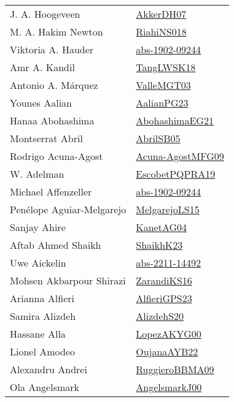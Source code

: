 {\begin{longtable}{p{4cm}p{20cm}}
J. A. Hoogeveen & \href{papers/AkkerDH07.pdf}{AkkerDH07}\cite{AkkerDH07} \\
M. A. Hakim Newton & \href{papers/RiahiNS018.pdf}{RiahiNS018}\cite{RiahiNS018} \\
Viktoria A. Hauder & \href{articles/abs-1902-09244.pdf}{abs-1902-09244}\cite{abs-1902-09244} \\
Amr A. Kandil & \href{}{TangLWSK18}\cite{TangLWSK18} \\
Antonio A. M{\'{a}}rquez & \href{papers/ValleMGT03.pdf}{ValleMGT03}\cite{ValleMGT03} \\
Younes Aalian & \href{papers/AalianPG23.pdf}{AalianPG23}\cite{AalianPG23} \\
Hanaa Abohashima & \href{articles/AbohashimaEG21.pdf}{AbohashimaEG21}\cite{AbohashimaEG21} \\
Montserrat Abril & \href{papers/AbrilSB05.pdf}{AbrilSB05}\cite{AbrilSB05} \\
Rodrigo Acuna{-}Agost & \href{papers/Acuna-AgostMFG09.pdf}{Acuna-AgostMFG09}\cite{Acuna-AgostMFG09} \\
W. Adelman & \href{articles/EscobetPQPRA19.pdf}{EscobetPQPRA19}\cite{EscobetPQPRA19} \\
Michael Affenzeller & \href{articles/abs-1902-09244.pdf}{abs-1902-09244}\cite{abs-1902-09244} \\
Pen{\'{e}}lope Aguiar{-}Melgarejo & \href{papers/MelgarejoLS15.pdf}{MelgarejoLS15}\cite{MelgarejoLS15} \\
Sanjay Ahire & \href{}{KanetAG04}\cite{KanetAG04} \\
Aftab Ahmed Shaikh & \href{}{ShaikhK23}\cite{ShaikhK23} \\
Uwe Aickelin & \href{articles/abs-2211-14492.pdf}{abs-2211-14492}\cite{abs-2211-14492} \\
Mohsen Akbarpour Shirazi & \href{articles/ZarandiKS16.pdf}{ZarandiKS16}\cite{ZarandiKS16} \\
Arianna Alfieri & \href{articles/AlfieriGPS23.pdf}{AlfieriGPS23}\cite{AlfieriGPS23} \\
Samira Alizdeh & \href{}{AlizdehS20}\cite{AlizdehS20} \\
Hassane Alla & \href{articles/LopezAKYG00.pdf}{LopezAKYG00}\cite{LopezAKYG00} \\
Lionel Amodeo & \href{papers/OujanaAYB22.pdf}{OujanaAYB22}\cite{OujanaAYB22} \\
Alexandru Andrei & \href{articles/RuggieroBBMA09.pdf}{RuggieroBBMA09}\cite{RuggieroBBMA09} \\
Ola Angelsmark & \href{papers/AngelsmarkJ00.pdf}{AngelsmarkJ00}\cite{AngelsmarkJ00} \\

\end{longtable}}
